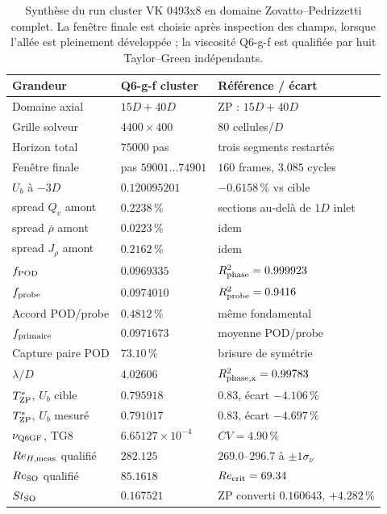 \documentclass[11pt,a4paper]{article}
\begin{document}
\begin{table}[htbp]
\centering
\caption{Synthèse du run cluster VK 0493x8 en domaine Zovatto--Pedrizzetti complet. La fenêtre finale est choisie après inspection des champs, lorsque l'allée est pleinement développée ; la viscosité Q6-g-f est qualifiée par huit Taylor--Green indépendants.}
\label{tab:x8-vk-summary}
\begin{tabular}{@{}lll@{}}
\toprule
Grandeur & Q6-g-f cluster & Référence / écart \\
\midrule
Domaine axial & $15D+40D$ & ZP : $15D+40D$ \\
Grille solveur & $4400\times400$ & $80$ cellules/$D$ \\
Horizon total & $75000$ pas & trois segments restartés \\
Fenêtre finale & pas $59001\ldots74901$ & $160$ frames, $3.085$ cycles \\
$U_b$ à $-3D$ & $0.120095201$ & $-0.6158\,\%$ vs cible \\
spread $Q_v$ amont & $0.2238\,\%$ & sections au-delà de $1D$ inlet \\
spread $\bar\rho$ amont & $0.0223\,\%$ & idem \\
spread $J_\rho$ amont & $0.2162\,\%$ & idem \\
$f_{\rm POD}$ & $0.0969335$ & $R^2_{\rm phase}=0.999923$ \\
$f_{\rm probe}$ & $0.0974010$ & $R^2_{\rm probe}=0.9416$ \\
Accord POD/probe & $0.4812\,\%$ & même fondamental \\
$f_{\rm primaire}$ & $0.0971673$ & moyenne POD/probe \\
Capture paire POD & $73.10\,\%$ & brisure de symétrie \\
$\lambda/D$ & $4.02606$ & $R^2_{\rm phase,x}=0.99783$ \\
$T^*_{\rm ZP}$, $U_b$ cible & $0.795918$ & $0.83$, écart $-4.106\,\%$ \\
$T^*_{\rm ZP}$, $U_b$ mesuré & $0.791017$ & $0.83$, écart $-4.697\,\%$ \\
$\nu_{\rm Q6GF}$, TG8 & $6.65127\times10^{-4}$ & $CV=4.90\,\%$ \\
$Re_{H,\rm meas}$ qualifié & $282.125$ & $269.0$--$296.7$ à $\pm1\sigma_\nu$ \\
$Re_{\rm SO}$ qualifié & $85.1618$ & $Re_{\rm crit}=69.34$ \\
$St_{\rm SO}$ & $0.167521$ & ZP converti $0.160643$, $+4.282\,\%$ \\
\bottomrule
\end{tabular}
\end{table}
\end{document}
